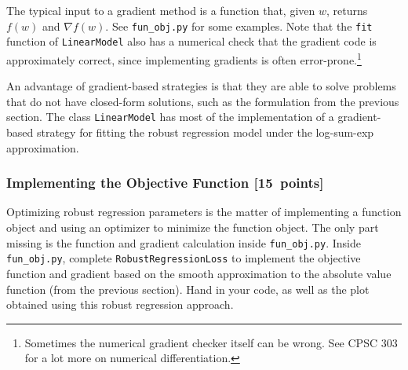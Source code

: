 \documentclass{article}
\newcommand{\blu}[1]{{\textcolor{blu}{#1}}}
\let\ask\blu
\newcommand\pts[1]{\textcolor{pointscolour}{[#1~points]}}
\begin{document}
The typical input to a gradient method is a function that, given $w$, returns $f(w)$ and $\nabla f(w)$. See \texttt{fun\_obj.py} for some examples. Note that the \texttt{fit} function of \texttt{LinearModel} also has a numerical check that the gradient code is approximately correct, since implementing gradients is often error-prone.\footnote{Sometimes the numerical gradient checker itself can be wrong. See CPSC 303 for a lot more on numerical differentiation.}

An advantage of gradient-based strategies is that they are able to solve
problems that do not have closed-form solutions, such as the formulation from the
previous section. The class \texttt{LinearModel} has most of the implementation
of a gradient-based strategy for fitting the robust regression model under the log-sum-exp approximation.

\subsubsection{Implementing the Objective Function \pts{15}}

Optimizing robust regression parameters is the matter of implementing a function object and using an optimizer to minimize the function object. The only part missing is the function and gradient calculation inside \texttt{fun\_obj.py}.
\ask{Inside \texttt{fun\_obj.py}, complete \texttt{RobustRegressionLoss} to implement the objective function and gradient based on the smooth
approximation to the absolute value function (from the previous section). Hand in your code, as well
as the plot obtained using this robust regression approach.}
\end{document}
